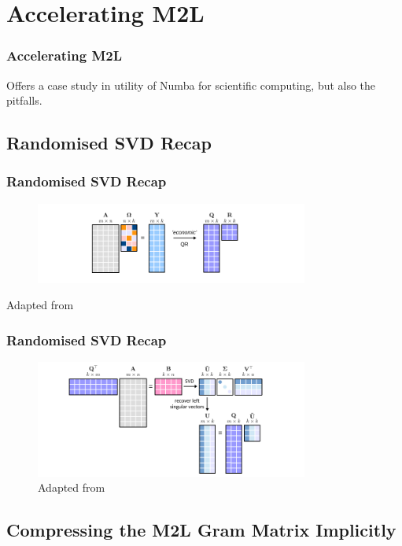 \section{Accelerating M2L}

\begin{frame}
    \frametitle{Accelerating M2L}
    Offers a case study in utility of Numba for scientific computing, but also the pitfalls.
\end{frame}

\subsection{Randomised SVD Recap}

\begin{frame}
    \frametitle{Randomised SVD Recap}
        \begin{figure}
        \centering
        {\includegraphics[width=0.8\textwidth]{assets/rsvd1.png}}
    \end{figure}
    Adapted from \cite{Erichson_2019}
\end{frame}

\begin{frame}
    \frametitle{Randomised SVD Recap}
        \begin{figure}
        \centering
        {\includegraphics[width=0.8\textwidth]{assets/rsvd2.png}}
    \\Adapted from \cite{Erichson_2019}
    \end{figure}
\end{frame}

\subsection{Compressing the M2L Gram Matrix Implicitly}

